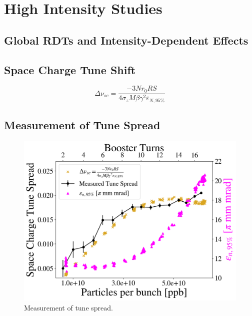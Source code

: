 \chapter{High Intensity Studies}
\label{sec:ch6}

\section{Global RDTs and Intensity-Dependent Effects}
\cite{mionrr}
\section{Space Charge Tune Shift}

\begin{equation}
    \Delta \nu_{sc}=\frac{-3 N r_0 R S}{4 \sigma_z M \beta \gamma ^2 \varepsilon_{N,95\%}}    
\end{equation}

\section{Measurement of Tune Spread}


\begin{figure}[H]
    \centering
    \includegraphics[width=\columnwidth]{chapter6/tune_spread.png}
    \caption{Measurement of tune spread.}
    \label{fig:tunespread}
\end{figure}

